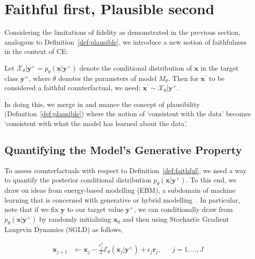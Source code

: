 \section{Faithful first, Plausible second}\label{faithfulness}

Considering the limitations of fidelity as demonstrated in the previous section, analogous to Definition~\ref{def:plausible}, we introduce a new notion of faithfulness in the context of CE:

\begin{definition}
  \label{def:faithful}
  Let $\mathcal{X}_{\theta}|\mathbf{y}^+ = p_{\theta}(\mathbf{x}|\mathbf{y}^+)$ denote the conditional distribution of $\mathbf{x}$ in the target class $\mathbf{y}^+$, where $\theta$ denotes the parameters of model $M_{\theta}$. Then for $\mathbf{x}^{\prime}$ to be considered a faithful counterfactual, we need: $\mathbf{x}^{\prime} \sim \mathcal{X}_{\theta}|\mathbf{y}^+$.
\end{definition}

In doing this, we merge in and nuance the concept of plausibility (Definition~\ref{def:plausible}) where the notion of `consistent with the data' becomes `consistent with what the model has learned about the data'.

\subsection{Quantifying the Model's Generative Property}

To assess counterfactuals with respect to Definition~\ref{def:faithful}, we need a way to quantify the posterior conditional distribution $p_{\theta}(\mathbf{x}|\mathbf{y}^+)$. To this end, we draw on ideas from energy-based modelling (EBM), a subdomain of machine learning that is concerned with generative or hybrid modelling~\citep{grathwohl2020your,du2019implicit}. In particular, note that if we fix $\mathbf{y}$ to our target value $\mathbf{y}^+$, we can conditionally draw from $p_{\theta}(\mathbf{x}|\mathbf{y}^+)$ by randomly initializing $\mathbf{x}_0$ and then using Stochastic Gradient Langevin Dynamics (SGLD) as follows, 

\begin{equation}\label{eq:sgld}
  \begin{aligned}
    \mathbf{x}_{j+1} &\leftarrow \mathbf{x}_j - \frac{\epsilon_j^2}{2} \mathcal{E}_{\theta}(\mathbf{x}_j|\mathbf{y}^+) + \epsilon_j \mathbf{r}_j, && j=1,...,J
  \end{aligned}
\end{equation}

